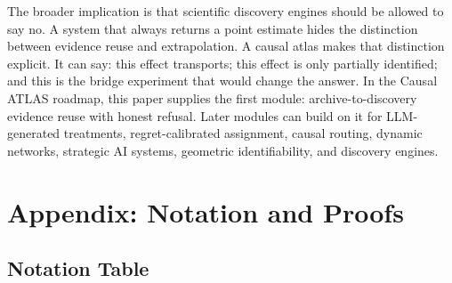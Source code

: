 \documentclass[11pt]{article}
\numberwithin{equation}{section}
\newcommand{\1}{\mathbf 1}
\begin{document}
The broader implication is that scientific discovery engines should be allowed to say no.  A system that always returns a point estimate hides the distinction between evidence reuse and extrapolation.  A causal atlas makes that distinction explicit.  It can say: this effect transports; this effect is only partially identified; and this is the bridge experiment that would change the answer.  In the Causal ATLAS roadmap, this paper supplies the first module: archive-to-discovery evidence reuse with honest refusal.  Later modules can build on it for LLM-generated treatments, regret-calibrated assignment, causal routing, dynamic networks, strategic AI systems, geometric identifiability, and discovery engines.

\appendix

\section{Appendix: Notation and Proofs}
\label{app:proofs}

\subsection{Notation Table}
\end{document}
